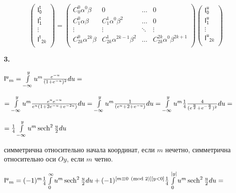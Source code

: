 \documentclass[a4paper,12pt]{article}
\begin{document}
\begin{displaymath}
    \begin{pmatrix}
        \mathsf{I^t_0} \\ \mathsf{I^t_1} \\ \vdots \\ \mathsf{I^t}_{\mathsf{2}k} \\
    \end{pmatrix} = \begin{pmatrix}
        C_0^0 \alpha^0 \beta & 0 & \ldots & 0 \\
        C_1^0 \alpha \beta & C_1^1 \alpha^{0} \beta^2 & \ldots & 0 \\
        \vdots & \vdots & \ddots & \vdots\\
        C_{2k}^0 \alpha^{2k} \beta & C_{2k}^1 \alpha^{2k - 1} \beta^2 & \ldots & C_{2k}^{2k} \alpha^{0} \beta^{2k + 1} \\
    \end{pmatrix} \begin{pmatrix}
        \mathsf{I^u_0} \\ \mathsf{I^u_1} \\ \vdots \\ \mathsf{I^u}_{\mathsf{2}k} \\
    \end{pmatrix}
\end{displaymath}

\noindent\textbf{3.}

\begin{center}
    $\mathsf{I^u}_m = \int\limits_{-\infty}^y u^m {e^{-u}\over{(1 + e^{-u}})^2} d u =$
\end{center}

\begin{center}
    $= \int\limits_{-\infty}^y u^m {e^{u}e^{-u}\over{e^{u}(1 + 2e^{-u}} + e^{-2u})} d u = \int\limits_{-\infty}^y u^m {1\over{(e^{u} + 2 + e^{-u})}} d u = \int\limits_{-\infty}^y u^m {1\over{4}} {4\over{(e^{u\over{2}} + e^{-{u\over{2}}})^2}} d u =$
\end{center}

\begin{center}
    $= {1\over{4}}\int\limits_{-\infty}^y u^m \operatorname{sech}^2{u\over{2}} d u$
\end{center}

 симметрична относительно начала координат, если $m$ нечетно, симметрична относительно оси $O y$, если $m$ четно. 

\begin{center}
    $\mathsf{I^u}_m = (-1)^m{1\over{4}} \int\limits_0^{\infty} u^m \operatorname{sech}^2{u\over{2}} d u  + (-1)^{[m \equiv 0 \pmod{2}][y < 0]}{1\over{4}}  \int\limits_0^{|y|} u^m \operatorname{sech}^2{u\over{2}} d u = $
\end{center}
\end{document}
